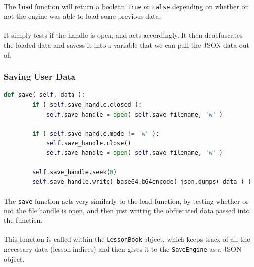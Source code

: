 \documentclass[11pt]{article}
\begin{document}
	\paragraph{}

	\paragraph{} The \texttt{load} function will return a boolean \texttt{True} or \texttt{False} depending on whether or not the engine was able to load some previous data.

	\paragraph{} It simply tests if the handle is open, and acts accordingly. It then deobfuscates the loaded data and savess it into a variable that we can pull the JSON data out of.  

	\newpage

	\subsubsection{Saving User Data}

\begin{lstlisting}[language=Python]
	def save( self, data ):
		if ( self.save_handle.closed ):
			self.save_handle = open( self.save_filename, 'w' )

		if ( self.save_handle.mode != 'w' ):
			self.save_handle.close()
			self.save_handle = open( self.save_filename, 'w' )

		self.save_handle.seek(0)
		self.save_handle.write( base64.b64encode( json.dumps( data ) ) )

\end{lstlisting}

	\paragraph{}

	\paragraph{} The \texttt{save} function acts very similarly to the load function, by testing whether or not the file handle is open, and then just writing the obfuscated data passed into the function.

	\paragraph{} This function is called within the \texttt{LessonBook} object, which keeps track of all the necessary data (lesson indices) and then gives it to the \texttt{SaveEngine} as a JSON object.
\end{document}
